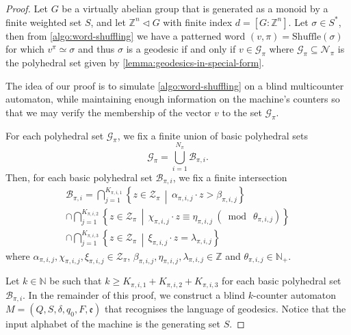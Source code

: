 \begin{proof}

Let $G$ be a virtually abelian group that is generated as a monoid by a finite weighted set $S$, and let $\mathbb{Z}^n \triangleleft G$ with finite index $d = [G : \mathbb{Z}^n]$.
Let $\sigma \in S^*$, then from \cref{algo:word-shuffling} we have a patterned word $(v,\pi) = \mathrm{Shuffle}(\sigma)$ for which $v^\pi \simeq \sigma$ and thus $\sigma$ is a geodesic if and only if $v \in \mathcal{G}_{\pi}$ where $\mathcal{G}_\pi \subseteq \mathcal{N}_\pi$ is the polyhedral set given by \cref{lemma:geodesics-in-special-form}.

The idea of our proof is to simulate \cref{algo:word-shuffling} on a blind multicounter automaton, while maintaining enough information on the machine's counters so that we may verify the membership of the vector $v$ to the set $\mathcal{G}_{\pi}$.

For each polyhedral set $\mathcal{G}_\pi$, we fix a finite union of basic polyhedral sets
\[
	\mathcal{G}_{\pi}
	=
	\bigcup_{i=1}^{N_\pi}
	\mathcal{B}_{\pi,i}.
\]
Then, for each basic polyhedral set $\mathcal{B}_{\pi,i}$, we fix a finite intersection
\begin{multline}\label{eq:decompose-basic-poly}
	\mathcal{B}_{\pi,i}
	=
	\bigcap_{j=1}^{K_{\pi,i,1}}
		\left\{
			z \in \mathcal{Z}_\pi
		\,\middle\vert\,
			\alpha_{\pi,i,j} \cdot z > \beta_{\pi,i,j}
		\right\}
	\\\cap
	\bigcap_{j=1}^{K_{\pi,i,2}}
		\left\{
			z \in \mathcal{Z}_\pi
		\,\middle\vert\,
			\chi_{\pi,i,j} \cdot z \equiv \eta_{\pi,i,j}\ (\bmod\ \theta_{\pi,i,j})
		\right\}
	\\\cap
	\bigcap_{j=1}^{K_{\pi,i,3}}
		\left\{
			z \in \mathcal{Z}_\pi
		\,\middle\vert\,
			\xi_{\pi,i,j} \cdot z = \lambda_{\pi,i,j}
		\right\}
\end{multline}
where $\alpha_{\pi,i,j},\chi_{\pi,i,j},\xi_{\pi,i,j} \in \mathcal{Z}_\pi$, $\beta_{\pi,i,j},\eta_{\pi,i,j},\lambda_{\pi,i,j} \in \mathbb{Z}$ and $\theta_{\pi,i,j} \in \mathbb{N}_+$.

Let $k \in \mathbb{N}$ be such that $k \geqslant K_{\pi,i,1} + K_{\pi,i,2} + K_{\pi,i,3}$ for each basic polyhedral set $\mathcal{B}_{\pi,i}$.
In the remainder of this proof, we construct a blind $k$-counter automaton $M = (Q,S,\delta,q_0,F,\mathfrak{e})$ that recognises the language of geodesics.
Notice that the input alphabet of the machine is the generating set $S$.


\end{proof}
